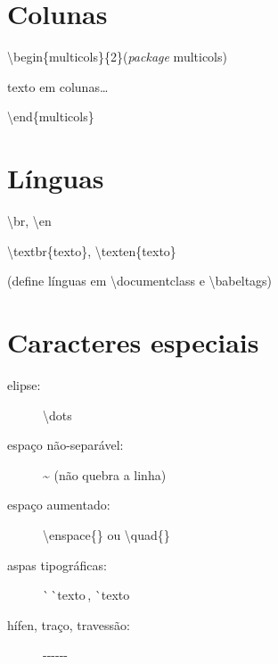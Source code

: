 \documentclass[11pt,twoside,english,brazilian]{article}
\begin{document}
\begin{multicols}{3}
\section*{Colunas}

\textbackslash{}begin\{multicols\}\{2\}\quad (\textit{package} \textsf{multicols})

\quad texto em colunas\dots

\textbackslash{}end\{multicols\}

\columnbreak

\section*{Línguas}

\textbackslash{}br, \textbackslash{}en

\textbackslash{}textbr\{texto\}, \textbackslash{}texten\{texto\}

(define línguas em \textsf{\textbackslash{}documentclass} e \textsf{\textbackslash{}babeltags})

\section*{Caracteres especiais}

\begin{description}
  \item[elipse:] \textbackslash{}dots
  \item[espaço não-separável:] \textasciitilde{} (não quebra a linha)
  \item[espaço aumentado:] \textbackslash{}enspace\{\} ou \textbackslash{}quad\{\}
  \item[aspas tipográficas:] \`{ }\,\`{ }texto\textquotesingle\,\textquotesingle,
                \`{ }texto\textquotesingle
  \item[hífen, traço, travessão:] -\quad -\hspace{.7pt}-\quad -\hspace{.7pt}-\hspace{.7pt}-
\end{description}

\vspace{\baselineskip}


\end{multicols}
\end{document}
